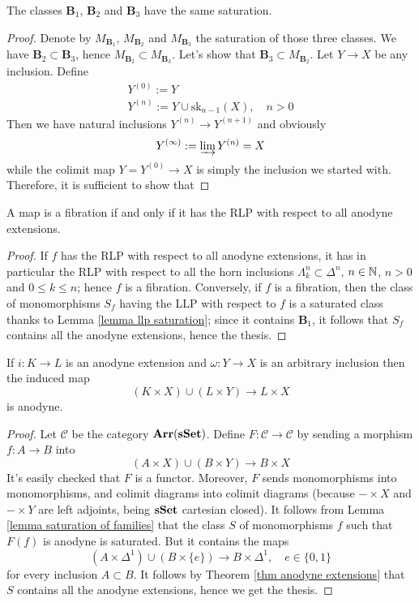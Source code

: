 \begin{thm} \label{thm anodyne extensions}
The classes $\mathbf B_1$, $\mathbf B_2$ and $\mathbf B_3$ have the same saturation.
\end{thm}

\begin{proof}
Denote by $M_{\mathbf B_1}$, $M_{\mathbf B_2}$ and $M_{\mathbf B_3}$ the saturation of those three classes. We have $\mathbf B_2 \subset \mathbf B_3$, hence $M_{\mathbf B_2} \subset M_{\mathbf B_3}$. Let's show that $\mathbf B_3 \subset M_{\mathbf B_2}$. Let $Y \to X$ be any inclusion. Define
\begin{gather*}
Y^{(0)} := Y \\
Y^{(n)} := Y \cup \mathrm{sk}_{n-1}(X), \quad n > 0
\end{gather*}
Then we have natural inclusions $Y^{(n)} \to Y^{(n+1)}$ and obviously
\[
Y^{(\infty)} := \varinjlim Y^{(n)} = X
\]
while the colimit map $Y = Y^{(0)} \to X$ is simply the inclusion we started with. Therefore, it is sufficient to show that 
\end{proof}

\begin{cor}
A map is a fibration if and only if it has the RLP with respect to all anodyne extensions.
\end{cor}

\begin{proof}
If $f$ has the RLP with respect to all anodyne extensions, it has in particular the RLP with respect to all the horn inclusions $\Lambda^n_k \subset \Delta^n$, $n \in \mathbb{N}$, $n > 0$ and $0 \le k \le n$; hence $f$ is a fibration. Conversely, if $f$ is a fibration, then the class of monomorphisms $S_f$ having the LLP with respect to $f$ is a saturated class thanks to Lemma \ref{lemma llp saturation}; since it contains $\mathbf B_1$, it follows that $S_f$ contains all the anodyne extensions, hence the thesis.
\end{proof}

\begin{cor}
If $i \colon K \to L$ is an anodyne extension and $\omega \colon Y \to X$ is an arbitrary inclusion then the induced map
\[
(K \times X) \cup (L \times Y) \to L \times X
\]
is anodyne.
\end{cor}

\begin{proof}
Let $\mathcal C$ be the category $\mathbf{Arr}(\mathbf{sSet})$. Define $F \colon \mathcal C \to \mathcal C$ by sending a morphism $f \colon A \to B$ into
\[
(A \times X) \cup (B \times Y) \to B \times X
\]
It's easily checked that $F$ is a functor. Moreover, $F$ sends monomorphisms into monomorphisms, and colimit diagrams into colimit diagrams (because $- \times X$ and $- \times Y$ are left adjoints, being $\mathbf{sSet}$ cartesian closed). It follows from Lemma \ref{lemma saturation of families} that the class $S$ of monomorphisms $f$ such that $F(f)$ is anodyne is saturated. But it contains the maps
\[
(A \times \Delta^1) \cup (B \times \{e\}) \to B \times \Delta^1, \quad e \in \{0,1\}
\]
for every inclusion $A \subset B$. It follows by Theorem \ref{thm anodyne extensions} that $S$ contains all the anodyne extensions, hence we get the thesis.
\end{proof}

